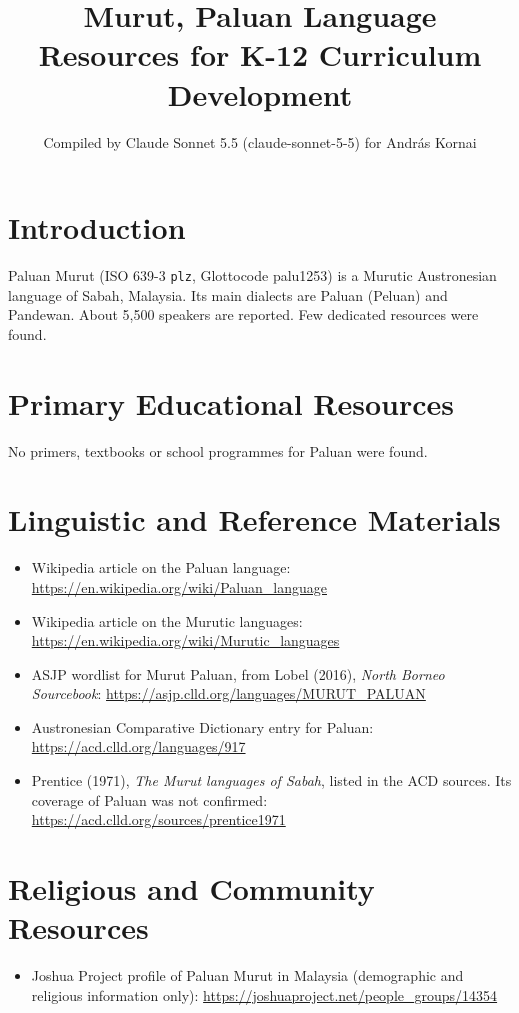 \documentclass[12pt]{article}
\title{Murut, Paluan Language Resources for K-12 Curriculum Development}
\author{Compiled by Claude Sonnet 5.5 (claude-sonnet-5-5) for Andr\'as Kornai}
\date{}
\begin{document}
\maketitle

\section{Introduction}
Paluan Murut (ISO 639-3 \texttt{plz}, Glottocode palu1253) is a Murutic Austronesian language of Sabah, Malaysia. Its main dialects are Paluan (Peluan) and Pandewan. About 5,500 speakers are reported. Few dedicated resources were found.

\section{Primary Educational Resources}
No primers, textbooks or school programmes for Paluan were found.

\section{Linguistic and Reference Materials}
\begin{itemize}
\item Wikipedia article on the Paluan language: \url{https://en.wikipedia.org/wiki/Paluan_language}
\item Wikipedia article on the Murutic languages: \url{https://en.wikipedia.org/wiki/Murutic_languages}
\item ASJP wordlist for Murut Paluan, from Lobel (2016), \emph{North Borneo Sourcebook}: \url{https://asjp.clld.org/languages/MURUT_PALUAN}
\item Austronesian Comparative Dictionary entry for Paluan: \url{https://acd.clld.org/languages/917}
\item Prentice (1971), \emph{The Murut languages of Sabah}, listed in the ACD sources. Its coverage of Paluan was not confirmed: \url{https://acd.clld.org/sources/prentice1971}
\end{itemize}

\section{Religious and Community Resources}
\begin{itemize}
\item Joshua Project profile of Paluan Murut in Malaysia (demographic and religious information only): \url{https://joshuaproject.net/people_groups/14354}
\end{itemize}
\end{document}
